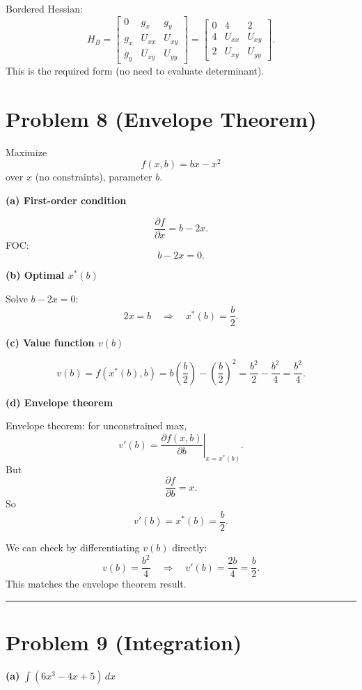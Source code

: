 \documentclass[12pt]{article}
\begin{document}
Bordered Hessian:
\[
H_B =
\begin{bmatrix}
0 & g_x & g_y\\
g_x & U_{xx} & U_{xy}\\
g_y & U_{xy} & U_{yy}
\end{bmatrix}
=
\begin{bmatrix}
0 & 4 & 2\\
4 & U_{xx} & U_{xy}\\
2 & U_{xy} & U_{yy}
\end{bmatrix}.
\]
This is the required form (no need to evaluate determinant).


\section*{Problem 8 (Envelope Theorem)}

Maximize
\[
f(x,b)=bx - x^2
\]
over \(x\) (no constraints), parameter \(b\).

\textbf{(a) First-order condition}

\[
\frac{\partial f}{\partial x} = b - 2x.
\]
FOC:
\[
b - 2x = 0.
\]

\textbf{(b) Optimal \(x^\ast(b)\)}

Solve \(b - 2x=0\):
\[
2x = b \quad \Rightarrow \quad x^\ast(b) = \frac{b}{2}.
\]

\textbf{(c) Value function \(v(b)\)}

\[
v(b) = f(x^\ast(b), b)
= b\left(\frac{b}{2}\right) - \left(\frac{b}{2}\right)^2
= \frac{b^2}{2} - \frac{b^2}{4}
= \frac{b^2}{4}.
\]

\textbf{(d) Envelope theorem}

Envelope theorem: for unconstrained max,
\[
v'(b) = \left.\frac{\partial f(x,b)}{\partial b}\right|_{x=x^\ast(b)}.
\]
But
\[
\frac{\partial f}{\partial b} = x.
\]
So
\[
v'(b) = x^\ast(b) = \frac{b}{2}.
\]

We can check by differentiating \(v(b)\) directly:
\[
v(b) = \frac{b^2}{4} \quad \Rightarrow \quad v'(b) = \frac{2b}{4} = \frac{b}{2}.
\]
This matches the envelope theorem result.

\hrule
\vspace{10pt}

\section*{Problem 9 (Integration)}

\textbf{(a)} \(\displaystyle \int (6x^3 - 4x + 5)\, dx\)
\end{document}

